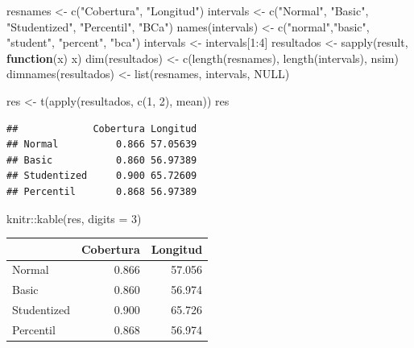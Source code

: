 \documentclass[
]{book}
\newenvironment{Shaded}{\begin{snugshade}}{\end{snugshade}}
\newcommand{\AttributeTok}[1]{\textcolor[rgb]{0.77,0.63,0.00}{#1}}
\newcommand{\ConstantTok}[1]{\textcolor[rgb]{0.00,0.00,0.00}{#1}}
\newcommand{\ControlFlowTok}[1]{\textcolor[rgb]{0.13,0.29,0.53}{\textbf{#1}}}
\newcommand{\DecValTok}[1]{\textcolor[rgb]{0.00,0.00,0.81}{#1}}
\newcommand{\FunctionTok}[1]{\textcolor[rgb]{0.00,0.00,0.00}{#1}}
\newcommand{\NormalTok}[1]{#1}
\newcommand{\OtherTok}[1]{\textcolor[rgb]{0.56,0.35,0.01}{#1}}
\newcommand{\SpecialCharTok}[1]{\textcolor[rgb]{0.00,0.00,0.00}{#1}}
\newcommand{\StringTok}[1]{\textcolor[rgb]{0.31,0.60,0.02}{#1}}
\theoremstyle{break}
\theoremstyle{nonumberplain}
\begin{document}
\begin{Shaded}
\begin{Highlighting}[]
\NormalTok{resnames }\OtherTok{\textless{}{-}} \FunctionTok{c}\NormalTok{(}\StringTok{"Cobertura"}\NormalTok{, }\StringTok{"Longitud"}\NormalTok{)}
\NormalTok{intervals }\OtherTok{\textless{}{-}} \FunctionTok{c}\NormalTok{(}\StringTok{"Normal"}\NormalTok{, }\StringTok{"Basic"}\NormalTok{, }\StringTok{"Studentized"}\NormalTok{, }\StringTok{"Percentil"}\NormalTok{, }\StringTok{"BCa"}\NormalTok{)}
\FunctionTok{names}\NormalTok{(intervals) }\OtherTok{\textless{}{-}} \FunctionTok{c}\NormalTok{(}\StringTok{"normal"}\NormalTok{,}\StringTok{"basic"}\NormalTok{, }\StringTok{"student"}\NormalTok{, }\StringTok{"percent"}\NormalTok{, }\StringTok{"bca"}\NormalTok{)}
\NormalTok{intervals }\OtherTok{\textless{}{-}}\NormalTok{ intervals[}\DecValTok{1}\SpecialCharTok{:}\DecValTok{4}\NormalTok{]}
\NormalTok{resultados }\OtherTok{\textless{}{-}} \FunctionTok{sapply}\NormalTok{(result, }\ControlFlowTok{function}\NormalTok{(x) x)}
\FunctionTok{dim}\NormalTok{(resultados) }\OtherTok{\textless{}{-}} \FunctionTok{c}\NormalTok{(}\FunctionTok{length}\NormalTok{(resnames), }\FunctionTok{length}\NormalTok{(intervals), nsim)}
\FunctionTok{dimnames}\NormalTok{(resultados) }\OtherTok{\textless{}{-}} \FunctionTok{list}\NormalTok{(resnames, intervals, }\ConstantTok{NULL}\NormalTok{)}

\NormalTok{res }\OtherTok{\textless{}{-}} \FunctionTok{t}\NormalTok{(}\FunctionTok{apply}\NormalTok{(resultados, }\FunctionTok{c}\NormalTok{(}\DecValTok{1}\NormalTok{, }\DecValTok{2}\NormalTok{), mean))}
\NormalTok{res}
\end{Highlighting}
\end{Shaded}

\begin{verbatim}
##             Cobertura Longitud
## Normal          0.866 57.05639
## Basic           0.860 56.97389
## Studentized     0.900 65.72609
## Percentil       0.868 56.97389
\end{verbatim}

\begin{Shaded}
\begin{Highlighting}[]
\NormalTok{knitr}\SpecialCharTok{::}\FunctionTok{kable}\NormalTok{(res, }\AttributeTok{digits =} \DecValTok{3}\NormalTok{)}
\end{Highlighting}
\end{Shaded}

\begin{tabular}{l|r|r}
\hline
  & Cobertura & Longitud\\
\hline
Normal & 0.866 & 57.056\\
\hline
Basic & 0.860 & 56.974\\
\hline
Studentized & 0.900 & 65.726\\
\hline
Percentil & 0.868 & 56.974\\
\hline
\end{tabular}
\end{document}
